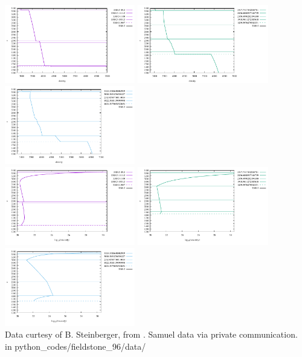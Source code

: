 \begin{center}
\includegraphics[width=5.7cm]{python_codes/fieldstone_96/data/rho_steinberger}
\includegraphics[width=5.7cm]{python_codes/fieldstone_96/data/rho_samuelA}
\includegraphics[width=5.7cm]{python_codes/fieldstone_96/data/rho_samuelB}\\
\includegraphics[width=5.7cm]{python_codes/fieldstone_96/data/eta_steinberger}
\includegraphics[width=5.7cm]{python_codes/fieldstone_96/data/eta_samuelA}
\includegraphics[width=5.7cm]{python_codes/fieldstone_96/data/eta_samuelB}\\
{\captionfont Data curtesy of B. Steinberger, from \cite{stwt10}.
Samuel data via private communication.} \\
{\tiny {\color{gray} in python\_codes/fieldstone\_96/data/}}
\end{center}

